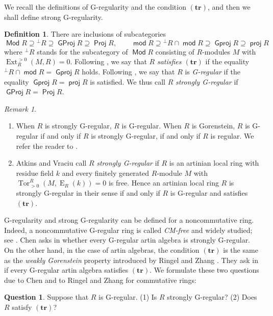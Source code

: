 \documentclass{amsart}
\theoremstyle{definition}
\newtheorem{dfn}[thm]{Definition}
\newtheorem{ques}[thm]{Question}
\theoremstyle{remark}
\newtheorem{rem}[thm]{Remark}
\numberwithin{equation}{thm}
\def\EE{\operatorname{E}}
\def\Ext{\operatorname{Ext}}
\def\Gproj{\operatorname{\mathsf{Gproj}}}
\def\GProj{\operatorname{\mathsf{GProj}}}
\def\Mod{\operatorname{\mathsf{Mod}}}
\def\mod{\operatorname{\mathsf{mod}}}
\def\Proj{\operatorname{\mathsf{Proj}}}
\def\proj{\operatorname{\mathsf{proj}}}
\def\Tor{\operatorname{Tor}}
\def\TR{(\mathbf{tr})}
\begin{document}
We recall the definitions of G-regularity and the condition $\TR$, and then we shall define strong G-regularity.

\begin{dfn}
There are inclusions of subcategories
$$
\Mod R\supseteq{}^\perp\!R\supseteq\GProj R\supseteq\Proj R,\qquad
\mod R\supseteq{}^\perp\!R\cap\mod R\supseteq\Gproj R\supseteq\proj R
$$
where ${}^\perp\!R$ stands for the subcategory of $\Mod R$ consisting of $R$-modules $M$ with $\Ext_R^{>0}(M,R)=0$.
Following \cite{KLOT}, we say that $R$ {\em satisfies $\TR$} if the equality ${}^\perp\!R\cap\mod R=\Gproj R$ holds.
Following \cite{T08}, we say that $R$ is \textit{G-regular} if the equality $\Gproj R=\proj R$ is satisfied.
We thus call $R$ \textit{strongly G-regular} if $\GProj R=\Proj R$.
\end{dfn}

\begin{rem}\label{5}
\begin{enumerate}[(1)]
\item
When $R$ is strongly G-regular, $R$ is G-regular.
When $R$ is Gorenstein, $R$ is G-regular if and only if $R$ is strongly G-regular, if and only if $R$ is regular.
We refer the reader to \cite[Proposition 1.8(1)]{T08}.
\item
Atkins and Vraciu \cite{AV} call $R$ {\em strongly G-regular} if $R$ is an artinian local ring with residue field $k$ and every finitely generated $R$-module $M$ with $\Tor_{>0}^R(M,\EE_R(k))=0$ is free.
Hence an artinian local ring $R$ is strongly G-regular in their sense if and only if $R$ is G-regular and satisfies $\TR$.
\end{enumerate}
\end{rem}

G-regularity and strong G-regularity can be defined for a noncommutative ring.
Indeed, a noncommutative G-regular ring is called \textit{CM-free} and widely studied; see \cite{B98,Che12,Che17,CY,HS,KP}.
Chen asks in \cite[Problem C]{Che17} whether every G-regular artin algebra is strongly G-regular.
On the other hand, in the case of artin algebras, the condition $\TR$ is the same as the {\em weakly Gorenstein} property introduced by Ringel and Zhang \cite{RZ}.
They ask in \cite[Question 9.2]{RZ} if every G-regular artin algebra satisfies $\TR$.
We formulate these two questions due to Chen and to Ringel and Zhang for commutative rings:

\begin{ques}\label{main ques}
Suppose that $R$ is G-regular.\quad
(1) Is $R$ strongly G-regular?\quad
(2) Does $R$ satisfy $\TR$?
\end{ques}
\end{document}
